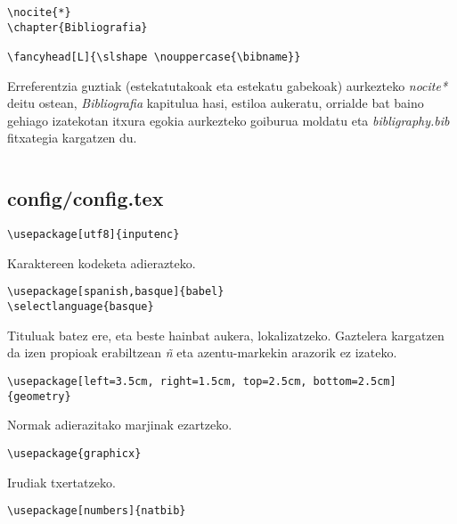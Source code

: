 \begin{verbatim}
\nocite{*}
\chapter{Bibliografia}

\fancyhead[L]{\slshape \nouppercase{\bibname}}

\end{verbatim}

Erreferentzia guztiak (estekatutakoak eta estekatu gabekoak) aurkezteko \emph{nocite{*}} deitu ostean, \emph{Bibliografia} kapitulua hasi, estiloa aukeratu, orrialde bat baino gehiago izatekotan itxura egokia aurkezteko goiburua moldatu eta \emph{bibligraphy.bib} fitxategia kargatzen du.

\begin{verbatim}

\end{verbatim}

\subsection*{config/config.tex}

\begin{verbatim}
\usepackage[utf8]{inputenc}
\end{verbatim}

Karaktereen kodeketa adierazteko.

\begin{verbatim}
\usepackage[spanish,basque]{babel} 
\selectlanguage{basque}
\end{verbatim}

Tituluak batez ere, eta beste hainbat aukera, lokalizatzeko. Gaztelera kargatzen da izen propioak erabiltzean \emph{ñ} eta azentu-markekin arazorik ez izateko. 

\begin{verbatim}
\usepackage[left=3.5cm, right=1.5cm, top=2.5cm, bottom=2.5cm]{geometry}
\end{verbatim}

Normak adierazitako marjinak ezartzeko.

\begin{verbatim}
\usepackage{graphicx}
\end{verbatim}

Irudiak txertatzeko.

\begin{verbatim}
\usepackage[numbers]{natbib}
\end{verbatim}

